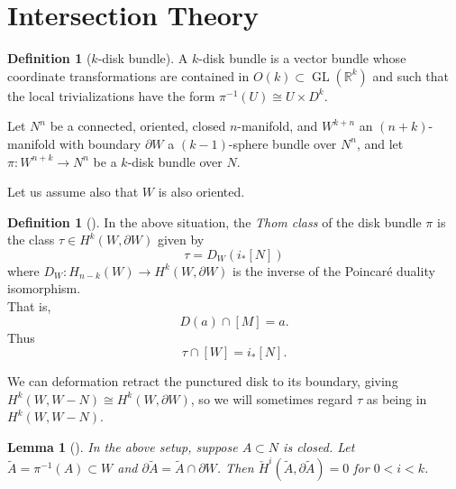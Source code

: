 \documentclass[reqno]{amsart}
\newtheorem{lemma}[theorem]{Lemma}
\theoremstyle{definition}
\newtheorem{definition}[theorem]{Definition}
\theoremstyle{remark}
\DeclareMathOperator{\GL}{GL}
\begin{document}
      



      


\section{Intersection Theory}



\begin{definition}[$k$-disk bundle]
    A $k$-disk bundle is a vector bundle whose
    coordinate transformations are contained in
    $O(k) \subset \GL (\mathbb{R}^{k})$ and such that
    the local trivializations have the form
    $\pi^{-1}(U) \cong U \times D^{k}$.
\end{definition}

Let $N^{n}$ be a connected, oriented, closed $n$-manifold, and
$W^{k+n}$ an $(n+k)$-manifold with boundary
$\partial W$ a $(k-1)$-sphere bundle over $N^{n}$, and let
$\pi \colon W^{n+k} \to N^{n}$ be a $k$-disk bundle over $N$.

Let us assume also that $W$ is also oriented.

\begin{definition}[]
    In the above situation, the \textit{Thom class} of the
    disk bundle $\pi$ is the class $\tau \in 
    H^{k}\left( W, \partial W \right) $ given by
    \[
    \tau = D_W \left( i_* \left[ N \right]  \right) 
    \] 
    where $D_W \colon H_{n-k} (W) \to H^{k}(W, \partial W)$ is
    the inverse of the Poincaré duality isomorphism.\\
    That is,
    \[
    D(a) \cap \left[ M \right]  = a.
    \] 
    Thus
    \[
    \tau \cap \left[ W \right] =
    i_* \left[ N \right] .
    \] 
\end{definition}

We can deformation retract the punctured disk to its boundary, giving
$H^{k}(W, W-N) \cong H^{k}(W, \partial W)$, so we will
sometimes regard
$\tau$ as being in $H^{k}(W, W-N)$.

\begin{lemma}[]
    In the above setup, suppose
    $A \subset N$ is closed. Let
    $\tilde{A} = \pi^{-1}(A) \subset W$ and
    $\partial \tilde{A} = \tilde{A} \cap \partial W$.
    Then
    $\check{H}^{i}\left( \tilde{A},
    \partial \tilde{A} \right) = 0$ for 
    $0<i < k$.
\end{lemma}
\end{document}
